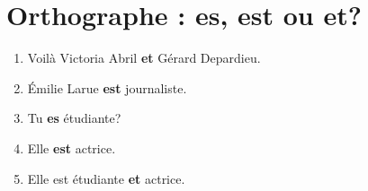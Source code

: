 \section{Orthographe : es, est ou et?}
\begin{enumerate}
    \item Voilà Victoria Abril \textbf{et} Gérard Depardieu.
    \item Émilie Larue \textbf{est} journaliste.
    \item Tu \textbf{es} étudiante?
    \item Elle \textbf{est} actrice.
    \item Elle est étudiante \textbf{et} actrice.
\end{enumerate}